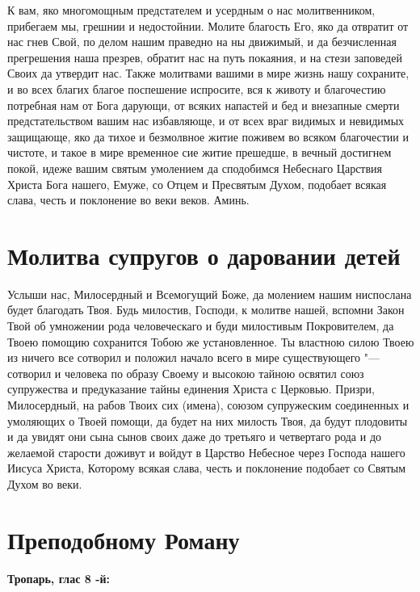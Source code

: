 К вам, яко многомощным предстателем и усердным о нас молитвенником, прибегаем мы, грешнии и недостойнии. Молите благость Его, яко да отвратит от нас гнев Свой, по делом нашим праведно на ны движимый, и да безчисленная прегрешения наша презрев, обратит нас на путь покаяния, и на стези заповедей Своих да утвердит нас. Также молитвами вашими в мире жизнь нашу сохраните, и во всех благих благое поспешение испросите, вся к животу и благочестию потребная нам от Бога дарующи, от всяких напастей и бед и внезапные смерти предстательством вашим нас избавляюще, и от всех враг видимых и невидимых защищающе, яко да тихое и безмолвное житие поживем во всяком благочестии и чистоте, и такое в мире временное сие житие прешедше, в вечный достигнем покой, идеже вашим святым умолением да сподобимся Небеснаго Царствия Христа Бога нашего, Емуже, со Отцем и Пресвятым Духом, подобает всякая слава, честь и поклонение во веки веков. Аминь.

\section{Молитва супругов о даровании детей}
 


Услыши нас, Милосердный и Всемогущий Боже, да молением нашим ниспослана будет благодать Твоя. Будь милостив, Господи, к молитве нашей, вспомни Закон Твой об умножении рода человеческаго и буди милостивым Покровителем, да Твоею помощию сохранится Тобою же установленное. Ты властною силою Твоею из ничего все сотворил и положил начало всего в мире существующего "--- сотворил и человека по образу Своему и высокою тайною освятил союз супружества и предуказание тайны единения Христа с Церковью. Призри, Милосердный, на рабов Твоих сих (имена), союзом супружеским соединенных и умоляющих о Твоей помощи, да будет на них милость Твоя, да будут плодовиты и да увидят они сына сынов своих даже до третьяго и четвертаго рода и до желаемой старости доживут и войдут в Царство Небесное через Господа нашего Иисуса Христа, Которому всякая слава, честь и поклонение подобает со Святым Духом во веки. 


\section{Преподобному Роману}
 
\bfseries Тропарь, глас 8 -й:\normalfont{}\nopagebreak


